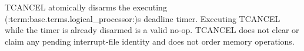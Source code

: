 TCANCEL atomically disarms the executing (:term:base.terms.logical_processor:)\textquotesingle{}s deadline timer.
Executing TCANCEL while the timer is already disarmed is a valid no-op. TCANCEL does not clear or claim any pending
interrupt-file identity and does not order memory operations.
